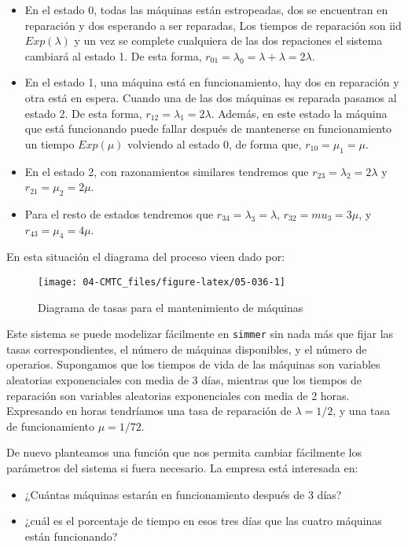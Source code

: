 \documentclass[
]{book}
\providecommand{\tightlist}{%
  \setlength{\itemsep}{0pt}\setlength{\parskip}{0pt}}
\theoremstyle{definition}
\theoremstyle{definition}
\theoremstyle{definition}
\theoremstyle{definition}
\theoremstyle{remark}
\begin{document}
\begin{itemize}
\item
  En el estado 0, todas las máquinas están estropeadas, dos se encuentran en reparación y dos esperando a ser reparadas, Los tiempos de reparación son iid \(Exp(\lambda)\) y un vez se complete cualquiera de las dos repaciones el sistema cambiará al estado 1. De esta forma, \(r_{01} = \lambda_0 = \lambda + \lambda = 2\lambda\).
\item
  En el estado 1, una máquina está en funcionamiento, hay dos en reparación y otra está en espera. Cuando una de las dos máquinas es reparada pasamos al estado 2. De esta forma, \(r_{12} = \lambda_1 = 2\lambda\). Además, en este estado la máquina que está funcionando puede fallar después de mantenerse en funcionamiento un tiempo \(Exp(\mu)\) volviendo al estado 0, de forma que, \(r_{10} = \mu_1 = \mu\).
\item
  En el estado 2, con razonamientos similares tendremos que \(r_{23} = \lambda_2 = 2\lambda\) y \(r_{21} = \mu_2 = 2\mu\).
\item
  Para el resto de estados tendremos que \(r_{34} = \lambda_3 = \lambda\), \(r_{32} = mu_3 = 3\mu\), y \(r_{43} = \mu_4 = 4\mu\).
\end{itemize}

En esta situación el diagrama del proceso vieen dado por:

\begin{figure}

{\centering \texttt{[image: 04-CMTC\_files/figure-latex/05-036-1]} 

}

\caption{Diagrama de tasas para el mantenimiento de máquinas}\label{fig:05-036}
\end{figure}

Este sistema se puede modelizar fácilmente en \texttt{simmer} sin nada más que fijar las tasas correspondientes, el número de máquinas disponibles, y el número de operarios. Supongamos que los tiempos de vida de las máquinas son variables aleatorias exponenciales con media de 3 días, mientras que los tiempos de reparación son variables aleatorias exponenciales con media de 2 horas. Expresando en horas tendríamos una tasa de reparación de \(\lambda = 1/2\), y una tasa de funcionamiento \(\mu = 1/72\).

De nuevo planteamos una función que nos permita cambiar fácilmente los parámetros del sistema si fuera necesario. La empresa está interesada en:

\begin{itemize}
\tightlist
\item
  ¿Cuántas máquinas estarán en funcionamiento después de 3 días?
\item
  ¿cuál es el porcentaje de tiempo en esos tres días que las cuatro máquinas están funcionando?
\end{itemize}
\end{document}
